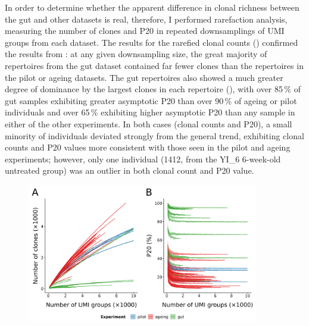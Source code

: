 In order to determine whether the apparent difference in clonal richness between the gut and other datasets is real, therefore, I performed rarefaction analysis, measuring the number of clones and P20 in repeated downsamplings of UMI groups from each dataset. The results for the rarefied clonal counts () confirmed the results from : at any given downsampling size, the great majority of repertoires from the gut dataset contained far fewer clones than the repertoires in the pilot or ageing datasets. The gut repertoires also showed a much greater degree of dominance by the largest clones in each repertoire (), with over 85\,\% of gut samples exhibiting greater asymptotic P20 than over 90\,\% of ageing or pilot individuals and over 65\,\% exhibiting higher asymptotic P20 than any sample in either of the other experiments. In both cases (clonal counts and P20), a small minority of individuals deviated strongly from the general trend, exhibiting clonal counts and P20 values more consistent with those seen in the pilot and ageing experiments; however, only one individual (1412, from the YI\_6 6-week-old untreated group) was an outlier in both clonal count and P20 value.

\begin{figure}
\centering
\includegraphics[width = 0.9\textwidth]{_Figures/png/igseq-rarefied-clones}
\begin{subfigure}{0em}
\label{fig:igseq-rarefied-clone-counts}
\end{subfigure}
\begin{subfigure}{0em}
\label{fig:igseq-rarefied-clone-p20}
\end{subfigure}
\label{fig:igseq-rarefied-clones}
\end{figure}

